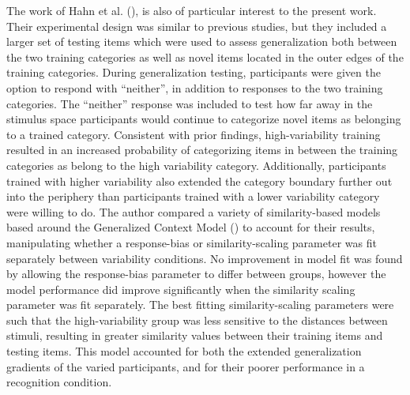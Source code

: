 \documentclass[
  11pt,
  letterpaper,
]{article}
\begin{document}
The work of Hahn et al.
(), is also of
particular interest to the present work. Their experimental design was
similar to previous studies, but they included a larger set of testing
items which were used to assess generalization both between the two
training categories as well as novel items located in the outer edges of
the training categories. During generalization testing, participants
were given the option to respond with ``neither'', in addition to
responses to the two training categories. The ``neither'' response was
included to test how far away in the stimulus space participants would
continue to categorize novel items as belonging to a trained category.
Consistent with prior findings, high-variability training resulted in an
increased probability of categorizing items in between the training
categories as belong to the high variability category. Additionally,
participants trained with higher variability also extended the category
boundary further out into the periphery than participants trained with a
lower variability category were willing to do. The author compared a
variety of similarity-based models based around the Generalized Context
Model
() to account for their results, manipulating whether a
response-bias or similarity-scaling parameter was fit separately between
variability conditions. No improvement in model fit was found by
allowing the response-bias parameter to differ between groups, however
the model performance did improve significantly when the similarity
scaling parameter was fit separately. The best fitting
similarity-scaling parameters were such that the high-variability group
was less sensitive to the distances between stimuli, resulting in
greater similarity values between their training items and testing
items. This model accounted for both the extended generalization
gradients of the varied participants, and for their poorer performance
in a recognition condition.
\end{document}
